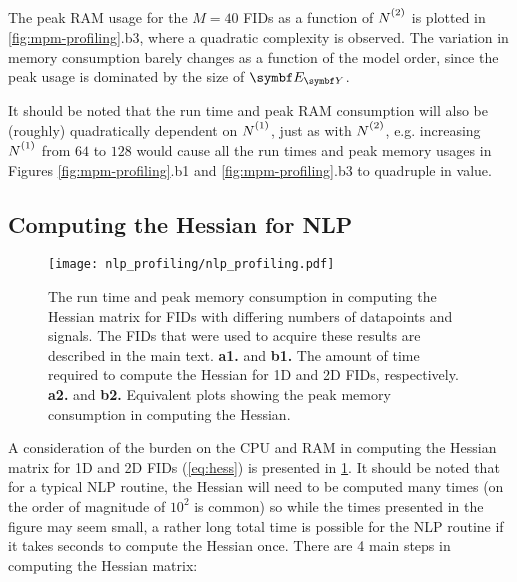The peak \ac{RAM} usage for the $M=40$ \acp{FID} as a function of $\Ntwo$ is
plotted in \cref{fig:mpm-profiling}.b3, where a quadratic complexity is
observed. The variation in memory consumption barely changes as a function of
the model order, since the peak usage is dominated by the size of
$\EY$.

It should be noted that the run time and peak \ac{RAM} consumption will also be
(roughly) quadratically dependent on $\None$, just as with $\Ntwo$, e.g.
increasing  $\None$ from  $64$ to $128$ would cause all the run times and peak
memory usages in Figures \ref{fig:mpm-profiling}.b1 and
\ref{fig:mpm-profiling}.b3 to quadruple in value.


\subsection{Computing the Hessian for \acs{NLP}}
\begin{figure}
    \centering
    \texttt{[image: nlp\_profiling/nlp\_profiling.pdf]}
    \caption[
        The run time and peak memory consumption in computing the Hessian
        matrix for \acsp{FID} with differing numbers of datapoints and signals.
    ]
    {
        The run time and peak memory consumption in computing the Hessian
        matrix for \acsp{FID} with differing numbers of datapoints and signals.
        The \acp{FID} that were used to acquire these results are described in
        the main text.
        \textbf{a1.} and \textbf{b1.} The amount of time required to compute the
        Hessian for \ac{1D} and \ac{2D} \acp{FID}, respectively.
        \textbf{a2.} and \textbf{b2.} Equivalent plots showing the peak memory
        consumption in computing the Hessian.
    }
    \label{fig:nlp-profiling}
\end{figure}
A consideration of the burden on the \ac{CPU} and \ac{RAM} in computing the
Hessian matrix for \ac{1D} and \ac{2D} \acp{FID} (\cref{eq:hess}) is presented in
\cref{fig:nlp-profiling}.
It should be noted that for a typical \ac{NLP} routine, the Hessian will need
to be computed many times (on the order of magnitude of $10^2$ is common) so
while the times presented in the figure may seem small, a rather long total
time is possible for the \ac{NLP} routine if it takes seconds to compute the
Hessian once.
There are 4 main steps in computing the Hessian matrix:
